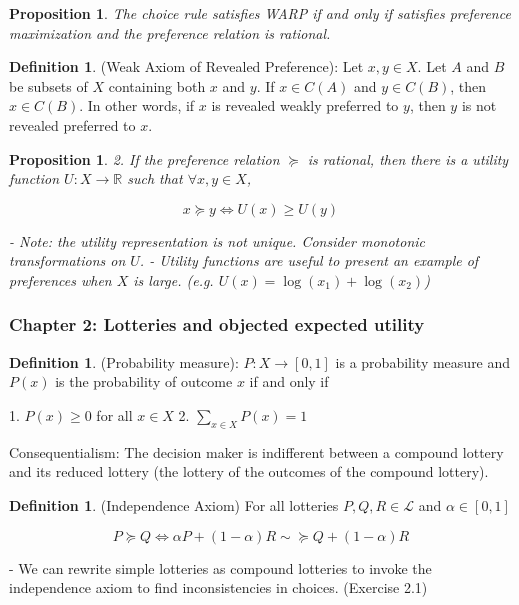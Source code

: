 \documentclass[12pt]{article}
\newtheorem{proposition}[theorem]{Proposition}
\theoremstyle{definition}
\newtheorem{definition}[theorem]{Definition}
\theoremstyle{remark}
\begin{document}
\begin{proposition} The choice rule satisfies WARP if and only if satisfies preference maximization and the preference relation is rational.

\end{proposition}

\begin{definition}(Weak Axiom of Revealed Preference): Let $x, y \in X$. Let $A$ and $B$ be subsets of $X$ containing both $x$ and $y$. If $x \in C(A)$ and $y \in C(B)$, then $x \in C(B)$. In other words, if $x$ is revealed weakly preferred to $y$, then $y$ is not revealed preferred to $x$.

\end{definition}

\begin{proposition}2. If the preference relation $\succeq$ is rational, then there is a utility function $U \colon X \to \mathbb{R}$ such that $\forall x, y \in X$, 

    \[
        x \succeq y \iff U(x) \geq U(y)
    \]

    - Note: the utility representation is not unique. Consider monotonic transformations on $U$.
    - Utility functions are useful to present an example of preferences when $X$ is large. (e.g. $U(x) = \log(x_1) + \log(x_2)$)

\end{proposition}

\subsubsection{Chapter 2: Lotteries and objected expected utility}

\begin{definition}(Probability measure): $P \colon X \to [0, 1]$ is a probability measure and $P(x)$ is the probability of outcome $x$ if and only if

    1. $P(x) \geq 0$ for all $x \in X$
    2. $\sum_{x \in X} P(x) = 1$

\end{definition}

Consequentialism: The decision maker is indifferent between a compound lottery and its reduced lottery (the lottery of the outcomes of the compound lottery).

\begin{definition}(Independence Axiom) For all lotteries $P, Q, R \in \mathcal{L}$ and $\alpha \in [0, 1]$

    \[
        P \succeq Q \iff \alpha P + (1 - \alpha) R \sim \succeq Q + (1 - \alpha) R
    \]

    - We can rewrite simple lotteries as compound lotteries to invoke the independence axiom to find inconsistencies in choices. (Exercise 2.1)

\end{definition}
\end{document}
